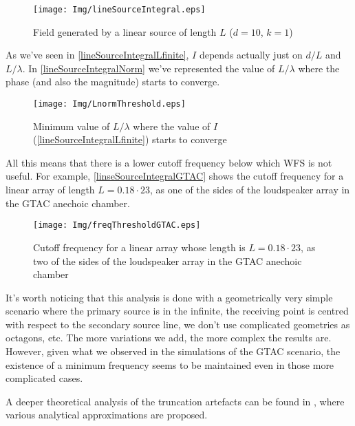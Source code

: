 \begin{figure}[h]
	\centering
	\texttt{[image: Img/lineSourceIntegral.eps]}
	\caption{Field generated by a linear source of length $L$ ($d = 10$, $k = 1$)}
	\label{lineSourceIntegral}
\end{figure}

As we've seen in \autoref{lineSourceIntegralLfinite}, $I$ depends actually just on $d/L$ and $L/\lambda$. In \autoref{lineSourceIntegralNorm} we've represented the value of $L/\lambda$ where the phase (and also the magnitude) starts to converge.

\begin{figure}[h]
	\centering
	\texttt{[image: Img/LnormThreshold.eps]}
	\caption{Minimum value of $L/\lambda$ where the value of $I$ (\autoref{lineSourceIntegralLfinite}) starts to converge}
	\label{lineSourceIntegralNorm}
\end{figure}

All this means that there is a lower cutoff frequency below which WFS is not useful. For example, \autoref{linseSourceIntegralGTAC} shows the cutoff frequency for a linear array of length $L = 0.18\cdot23$, as one of the sides of the loudspeaker array in the GTAC anechoic chamber.
\begin{figure}[h]
	\centering
	\texttt{[image: Img/freqThresholdGTAC.eps]}
	\caption{Cutoff frequency for a linear array whose length is $L = 0.18\cdot23$, as two of the sides of the loudspeaker array in the GTAC anechoic chamber}
	\label{linseSourceIntegralGTAC}
\end{figure}

It's worth noticing that this analysis is done with a geometrically very simple scenario where the primary source is in the infinite, the receiving point is centred with respect to the secondary source line, we don't use complicated geometries as octagons, etc. The more variations we add, the more complex the results are. However, given what we observed in the simulations of the GTAC scenario, the existence of a minimum frequency seems to be maintained even in those more complicated cases.

A deeper theoretical analysis of the truncation artefacts can be found in \cite[Section 4.3]{Start1997}, where various analytical approximations are proposed.